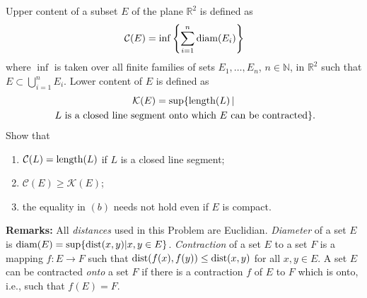 \documentclass{article}
\begin{document}
	\setlength{\parindent}{0pt}
	Upper content of a subset $E$ of the plane $\mathbb{R}^2$ is defined as
	$$\mathcal{C}(E)=\inf\left\{\sum_{i=1}^{n}\textup{diam}(E_i)\right\}$$
	where $\inf$ is taken over all finite families of sets $E_1,\dots,E_n$, $n\in\mathbb{N}$, in $\mathbb{R}^2$ such that $E\subset\bigcup_{i=1}^n E_i$. Lower content of $E$ is defined as
	\begin{multline*}
		\mathcal{K}(E)=\sup\{\textup{length}(L)\,\vert\\\
		 \textup{$L$ is a closed line segment onto which $E$ can be contracted}\}.
	\end{multline*}
	Show that
	\begin{enumerate}[label=(\alph*)]
		\item $\mathcal{C}(L)=\textup{length}(L)$ if $L$ is a closed line segment;
		\item $\mathcal{C}(E)\geq\mathcal{K}(E)$;
		\item the equality in $(b)$ needs not hold even if $E$ is compact.
	\end{enumerate}
	\textbf{Remarks:} All \textit{distances} used in this Problem are Euclidian. \textit{Diameter} of a set $E$ is $\textup{diam}(E)=\sup\{\textup{dist}(x,y)\vert x,y\in E\}$. \textit{Contraction} of a set $E$ to a set $F$ is a mapping $f:E\to F$ such that $\textup{dist}(f(x),f(y))\leq\textup{dist}(x,y)$ for all $x,y\in E$. A set $E$ can be contracted \textit{onto} a set $F$ if there is a contraction $f$ of $E$ to $F$ which is onto, i.e., such that $f(E)=F$. 
\end{document}
